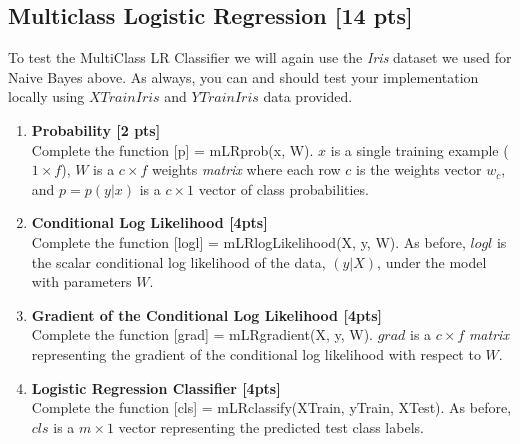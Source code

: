 \subsection*{Multiclass Logistic Regression [14 pts]}
To test the MultiClass LR Classifier we will again use the \textit{Iris} dataset we used for Naive Bayes above. As always, you can and should test your implementation locally using $XTrainIris$ and $YTrainIris$ data provided. 

\begin{enumerate}
\item \textbf{Probability [2 pts]}\\
Complete the function \textsf{[p] = mLRprob(x, W)}. $x$ is a single training example ($1 \times f$), $W$ is a $c \times f$ weights \textit{matrix} where each row $c$ is the weights vector $w_c$, and $p = p(y|x)$ is a $c \times 1$ vector of class probabilities.

\item \textbf{Conditional Log Likelihood [4pts]}\\
Complete the function \textsf{[logl] = mLRlogLikelihood(X, y, W)}. As before, $logl$ is the scalar conditional log likelihood of the data, $(y|X)$, under the model with parameters $W$.

\item \textbf{Gradient of the Conditional Log Likelihood [4pts]}\\
Complete the function \textsf{[grad] = mLRgradient(X, y, W)}. $grad$ is a $c \times f$ \textit{matrix} representing the gradient of the conditional log likelihood with respect to $W$. 

\item \textbf{Logistic Regression Classifier [4pts]}\\
Complete the function \textsf{[cls] = mLRclassify(XTrain, yTrain, XTest)}. As before, $cls$ is a $m \times 1$ vector representing the predicted test class labels. 
\end{enumerate}

